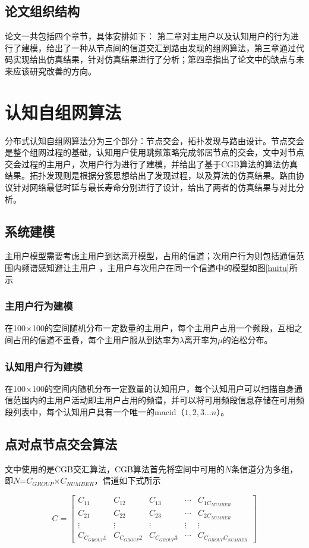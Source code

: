 \documentclass[a4paper,AutoFakeBold,oneside,12pt]{book}
\begin{document}
\section{论文组织结构}
  论文一共包括四个章节，具体安排如下：
  第二章对主用户以及认知用户的行为进行了建模，给出了一种从节点间的信道交汇到路由发现的组网算法，第三章通过代码实现给出仿真结果，针对仿真结果进行了分析；第四章指出了论文中的缺点与未来应该研究改善的方向。
\chapter{认知自组网算法}
  分布式认知自组网算法分为三个部分：节点交会，拓扑发现与路由设计。节点交会是整个组网过程的基础，认知用户使用跳频策略完成邻居节点的交会，文中对节点交会过程的主用户，次用户行为进行了建模，并给出了基于CGB算法的算法仿真结果。拓扑发现则是根据分簇思想给出了发现过程，以及算法的仿真结果。路由协议针对网络最低时延与最长寿命分别进行了设计，给出了两者的仿真结果与对比分析。
\section{系统建模}
  主用户模型需要考虑主用户到达离开模型，占用的信道；次用户行为则包括通信范围内频谱感知避让主用户
  ，主用户与次用户在同一个信道中的模型如图\ref{huitu}所示
\subsection{主用户行为建模}
  在100$\times$100的空间随机分布一定数量的主用户，每个主用户占用一个频段，互相之间占用的信道不重叠，每个主用户服从到达率为$\lambda$离开率为$\mu$的泊松分布。
  \subsection{认知用户行为建模}
  在100$\times$100的空间内随机分布一定数量的认知用户，每个认知用户可以扫描自身通信范围内的主用户活动即主用户占用的频谱，并可以将可用频段信息存储在可用频段列表中，每个认知用户具有一个唯一的macid（$1,2,3 ...n$）。
 \section{点对点节点交会算法}
  文中使用的是CGB交汇算法\cite{认知无线自组网中组网技术研究}，CGB算法首先将空间中可用的$N$条信道分为多组，即$N$=$C_{GROUP}$$\times$$C_{NUMBER}$，信道如下式所示
  
\begin{equation}
C={
\left[
\begin{matrix}
C_{11} & C_{12} & C_{13}  &\cdots & C_{1C_{NUMBER}} \\
C_{21} & C_{22} & C_{23}  &\cdots & C_{2C_{NUMBER}} \\
\vdots & \vdots & \vdots  &\vdots &  \vdots \\
C_{C_{GROUP}1} & C_{C_{GROUP}2} & C_{C_{GROUP}3}  &\cdots & C_{C_{GROUP}C_{NUMBER}} 
\end{matrix}  
\right]}
\end{equation}
 
\end{document}
